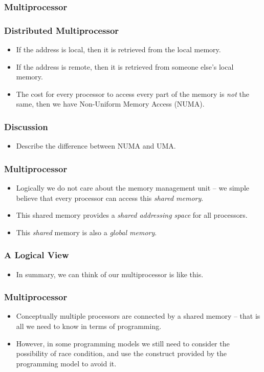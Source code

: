 \documentclass{beamer}
\begin{document}
\begin{CJK}{UTF8}{bsmi}
\begin{frame}
\frametitle{Multiprocessor}
\centerline{}
\end{frame}

\begin{frame}
\frametitle{Distributed Multiprocessor}
\begin{itemize}
\item If the address is local, then it is retrieved from the
  local memory.
\item If the address is remote, then it is retrieved from someone
  else's  local memory.
\item The cost for every processor to access every part of the memory
  is {\em not} the same, then we have Non-Uniform Memory Access
  (NUMA).
\end{itemize}
\end{frame}

\begin{frame}
\frametitle{Discussion}
\begin{itemize}
\item Describe the difference between NUMA and UMA.
\end{itemize}
\end{frame}

\begin{frame}
\frametitle{Multiprocessor}
\begin{itemize}
\item Logically we do not care about the memory management unit -- we
  simple believe that every processor can access this {\em shared
    memory}.
\item This shared memory provides a {\em shared addressing space} for
  all processors.
\item This {\em shared} memory is also a {\em global memory}.
\end{itemize}
\end{frame}


\begin{frame}
\frametitle{A Logical View}
\begin{itemize}
\item In summary, we can think of our multiprocessor is like this.
\end{itemize}
\centerline{}
\end{frame}

\begin{frame}
\frametitle{Multiprocessor}
\begin{itemize}
\item Conceptually multiple processors are connected by a shared
  memory -- that is all we need to know in terms of programming.
\item However, in some programming models we still need to consider
  the possibility of race condition, and use the construct provided
  by the programming model to avoid it.
\end{itemize}
\end{frame}


\end{CJK}
\end{document}
